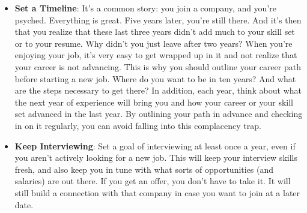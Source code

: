 \documentclass{report}
\begin{document}
\begin{itemize}
\begin{enumerate}
                \item \textbf{Use Your Best Medium:} Many people will advise you to only negotiate over the phone. To a certain extent, they're right; it is better to negotiate over the phone. However, if you don't feel comfortable on a phone negotiation, do it via email. It's more important that you attempt to negotiate than that you do it via a specific medium.
            \end{enumerate}
            Additionally, if you're negotiating with a big company, you should know that they often have "levels" for employees, where all employees at a particular level are paid around the same amount. Microsoft has a particularly well-defined system for this. You can negotiate within the salary range for your level, but going beyond that requires bumping up a level. If you're looking for a big bump, you'll need to convince the recruiter and your future team that your experience matches this higher level-a difficult, but feasible, thing to do.
        \item \textbf{Set a Timeline}: It's a common story: you join a company, and you're psyched. Everything is great. Five years later, you're still there. And it's then that you realize that these last three years didn't add much to your skill set or to your resume. Why didn't you just leave after two years?
            \bigbreak \noindent 
            When you're enjoying your job, it's very easy to get wrapped up in it and not realize that your career is not advancing. This is why you should outline your career path before starting a new job. Where do you want to be in ten years? And what are the steps necessary to get there? In addition, each year, think about what the next year of experience will bring you and how your career or your skill set advanced in the last year.
            \bigbreak \noindent 
            By outlining your path in advance and checking in on it regularly, you can avoid falling into this complacency trap.
        \item \textbf{Keep Interviewing}: Set a goal of interviewing at least once a year, even if you aren't actively looking for a new job. This will keep your interview skills fresh, and also keep you in tune with what sorts of opportunities (and salaries) are out there.
            \bigbreak \noindent 
            If you get an offer, you don't have to take it. It will still build a connection with that company in case you want to join at a later date.
    \end{itemize}
\end{document}
